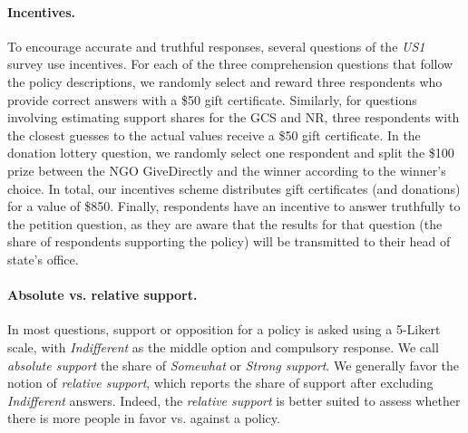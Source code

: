 \begin{small}
\paragraph{\small Incentives.} %
To encourage accurate and truthful responses, several questions of the \textit{US1} survey use incentives. For each of the three comprehension questions that follow the policy descriptions, we randomly select and reward three respondents who provide correct answers with a \$50 gift certificate. Similarly, for questions involving estimating support shares for the GCS and NR, three respondents with the closest guesses to the actual values receive a \$50 gift certificate. In the donation lottery question, we randomly select one respondent and split the \$100 prize between the NGO GiveDirectly and the winner according to the winner's choice. In total, our incentives scheme distributes gift certificates (and donations) for a value of \$850. Finally, respondents have an incentive to answer truthfully to the petition question, as they are aware that the results for that question (the share of respondents supporting the policy) will be transmitted to their head of state's office.


\paragraph{\small Absolute vs. relative support.}
In most questions, support or opposition for a policy is asked using a 5-Likert scale, with \textit{Indifferent} as the middle option and compulsory response. We call \textit{absolute support} the share of \textit{Somewhat} or \textit{Strong support}. We generally favor the notion of \textit{relative support}, which reports the share of support after excluding \textit{Indifferent} answers. Indeed, the \textit{relative support} is better suited to assess whether there is more people in favor vs. against a policy.


\end{small}
